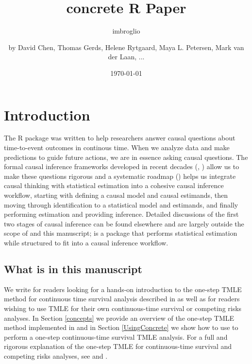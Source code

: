 \documentclass{report}
\author{imbroglio}
\date{\today}
\title{}
\newcommand{\1}{\ensuremath{\mathbf{1}}}
\begin{document}
\title{concrete R Paper}
\subtitle{}
\author{by David Chen, Thomas Gerds, Helene Rytgaard, Maya L. Petersen, Mark van der Laan, ...}

\maketitle

\section{Introduction}
\label{intro}
The R package  was written to help researchers answer causal questions about time-to-event outcomes in continous time. When we analyze data and make predictions to guide future actions, we are in essence asking causal questions. The formal causal inference frameworks developed in recent decades (\cite{pearl_causal_2016}, \cite{holland_statistics_1986}) allow us to make these questions rigorous and a systematic roadmap (\cite{petersen_causal_2014}) helps us integrate causal thinking with statistical estimation into a cohesive causal inference workflow, starting with defining a causal model and causal estimands, then moving through identification to a statistical model and estimands, and finally performing estimation and providing inference. Detailed discussions of the first two stages of causal inference can be found elsewhere and are largely outside the scope of  and this manuscript;  is a package that performs statistical estimation while structured to fit into a causal inference workflow.

\subsection{What is in this manuscript}
\label{sec:org89a8854}
We write for readers looking for a hands-on introduction to the one-step TMLE method for
continuous time survival analysis described in \cite{rytgaard_one-step_2021} as well as for readers
wishing to use TMLE for their own continuous-time survival or competing risks analyses. In Section \ref{concepts} we provide an overview of the one-step TMLE method implemented in 
and in Section \ref{UsingConcrete} we show how to use  to perform a one-step continuous-time survival TMLE analysis. For a full and rigorous explanation of the one-step TMLE for continuous-time survival and competing risks analyses, see \cite{rytgaard_one-step_2021} and \cite{rytgaard_continuous-time_2021}. 
\end{document}
